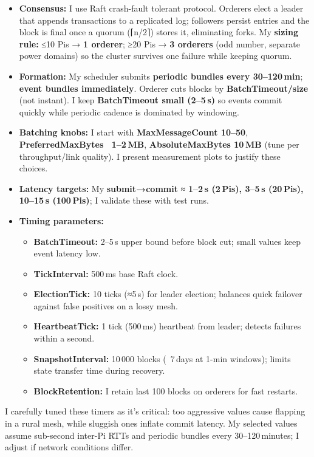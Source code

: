 \documentclass[12pt]{article}
\begin{document}
\begin{itemize}
\item \textbf{Consensus:} I use Raft crash-fault tolerant protocol. Orderers elect a leader that appends transactions to a replicated log; followers persist entries and the block is final once a quorum (⌈n/2⌉) stores it, eliminating forks. My \textbf{sizing rule:} ≤10 Pis → \textbf{1 orderer}; ≥20 Pis → \textbf{3 orderers} (odd number, separate power domains) so the cluster survives one failure while keeping quorum.
\item \textbf{Formation:} My scheduler submits \textbf{periodic bundles every 30–120 min}; \textbf{event bundles immediately}. Orderer cuts blocks by \textbf{BatchTimeout/size} (not instant). I keep \textbf{BatchTimeout small (2–5 s)} so events commit quickly while periodic cadence is dominated by windowing.
\item \textbf{Batching knobs:} I start with \textbf{MaxMessageCount 10–50}, \textbf{PreferredMaxBytes ~1–2 MB}, \textbf{AbsoluteMaxBytes 10 MB} (tune per throughput/link quality). I present measurement plots to justify these choices.
\item \textbf{Latency targets:} My \textbf{submit→commit} ≈ \textbf{1–2 s (2 Pis), 3–5 s (20 Pis), 10–15 s (100 Pis)}; I validate these with test runs.
\item \textbf{Timing parameters:}
  \begin{itemize}
  \item \textbf{BatchTimeout:} 2–5 s upper bound before block cut; small values keep event latency low.
  \item \textbf{TickInterval:} 500 ms base Raft clock.
  \item \textbf{ElectionTick:} 10 ticks (≈5 s) for leader election; balances quick failover against false positives on a lossy mesh.
  \item \textbf{HeartbeatTick:} 1 tick (500 ms) heartbeat from leader; detects failures within a second.
  \item \textbf{SnapshotInterval:} 10 000 blocks (~7 days at 1-min windows); limits state transfer time during recovery.
  \item \textbf{BlockRetention:} I retain last 100 blocks on orderers for fast restarts.
  \end{itemize}
\end{itemize}

I carefully tuned these timers as it's critical: too aggressive values cause flapping in a rural mesh, while sluggish ones inflate commit latency. My selected values assume sub-second inter-Pi RTTs and periodic bundles every 30–120 minutes; I adjust if network conditions differ.
\end{document}
